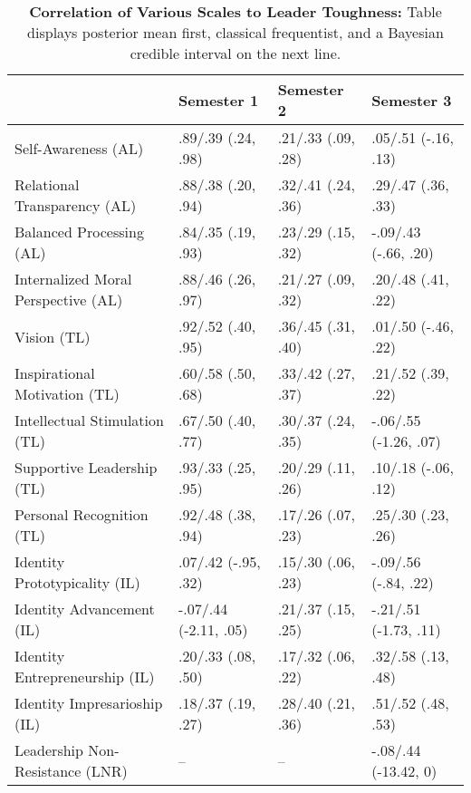 \begin{table}[ht]
\centering
\begin{tabular}{llll}
  \hline
 & Semester 1 & Semester 2 & Semester 3 \\ 
  \hline
Self-Awareness (AL) & .89/.39 (.24, .98) & .21/.33 (.09, .28) & .05/.51 (-.16, .13) \\ 
  Relational Transparency (AL) & .88/.38 (.20, .94) & .32/.41 (.24, .36) & .29/.47 (.36, .33) \\ 
  Balanced Processing (AL) & .84/.35 (.19, .93) & .23/.29 (.15, .32) & -.09/.43 (-.66, .20) \\ 
  Internalized Moral Perspective (AL) & .88/.46 (.26, .97) & .21/.27 (.09, .32) & .20/.48 (.41, .22) \\ 
  Vision (TL) & .92/.52 (.40, .95) & .36/.45 (.31, .40) & .01/.50 (-.46, .22) \\ 
  Inspirational Motivation (TL) & .60/.58 (.50, .68) & .33/.42 (.27, .37) & .21/.52 (.39, .22) \\ 
  Intellectual Stimulation (TL) & .67/.50 (.40, .77) & .30/.37 (.24, .35) & -.06/.55 (-1.26, .07) \\ 
  Supportive Leadership (TL) & .93/.33 (.25, .95) & .20/.29 (.11, .26) & .10/.18 (-.06, .12) \\ 
  Personal Recognition (TL) & .92/.48 (.38, .94) & .17/.26 (.07, .23) & .25/.30 (.23, .26) \\ 
  Identity Prototypicality (IL) & .07/.42 (-.95, .32) & .15/.30 (.06, .23) & -.09/.56 (-.84, .22) \\ 
  Identity Advancement (IL) & -.07/.44 (-2.11, .05) & .21/.37 (.15, .25) & -.21/.51 (-1.73, .11) \\ 
  Identity Entrepreneurship (IL) & .20/.33 (.08, .50) & .17/.32 (.06, .22) & .32/.58 (.13, .48) \\ 
  Identity Impresarioship (IL) & .18/.37 (.19, .27) & .28/.40 (.21, .36) & .51/.52 (.48, .53) \\ 
  Leadership Non-Resistance (LNR) & -- & -- & -.08/.44 (-13.42, 0) \\ 
   \hline
\end{tabular}
\caption{\textbf{Correlation of Various Scales to Leader Toughness:} Table displays posterior mean first, classical frequentist, and a Bayesian credible interval on the next line.} 
\label{tab:lead_corr}
\end{table}
